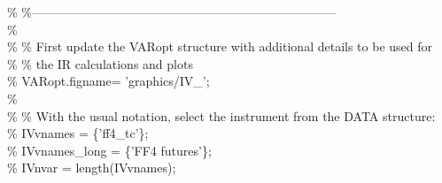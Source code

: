 \hspace{1mm}\hspace{5mm} \textcolor{matlabgreen}{\% }\textcolor{matlabgreen}{\%--------------------------------------------------------------------------  }\\ 
\hspace{1mm}\hspace{5mm} \textcolor{matlabgreen}{\%  }\\ 
\hspace{1mm}\hspace{5mm} \textcolor{matlabgreen}{\% }\textcolor{matlabgreen}{\% First update the VARopt structure with additional details to be used \textcolor{matlabblue}{for} }\\ 
\hspace{1mm}\hspace{5mm} \hspace{5mm} \textcolor{matlabgreen}{\% }\textcolor{matlabgreen}{\% the IR calculations and plots }\\ 
\hspace{1mm}\hspace{5mm} \hspace{5mm} \textcolor{matlabgreen}{\% VARopt.figname= 'graphics/IV\_'; }\\ 
\hspace{1mm}\hspace{5mm} \hspace{5mm} \textcolor{matlabgreen}{\%  }\\ 
\hspace{1mm}\hspace{5mm} \hspace{5mm} \textcolor{matlabgreen}{\% }\textcolor{matlabgreen}{\% With the usual notation, select the instrument from the DATA structure: }\\ 
\hspace{1mm}\hspace{5mm} \hspace{5mm} \textcolor{matlabgreen}{\% IVvnames      = \{'ff4\_tc'\}; }\\ 
\hspace{1mm}\hspace{5mm} \hspace{5mm} \textcolor{matlabgreen}{\% IVvnames\_long = \{'FF4 futures'\}; }\\ 
\hspace{1mm}\hspace{5mm} \hspace{5mm} \textcolor{matlabgreen}{\% IVnvar        = length(IVvnames); }\\ 
